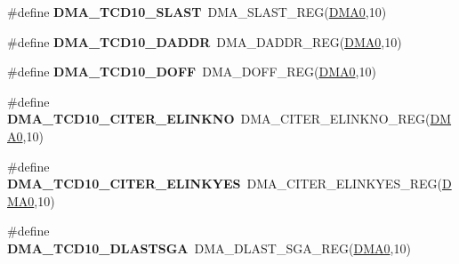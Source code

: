 \begin{DoxyCompactItemize}
\item 
\#define {\bfseries D\+M\+A\+\_\+\+T\+C\+D10\+\_\+\+S\+L\+A\+ST}~D\+M\+A\+\_\+\+S\+L\+A\+S\+T\+\_\+\+R\+EG(\hyperlink{group__DMA__Peripheral__Access__Layer_ga4103044f9ca209772f513dc694513ffb}{D\+M\+A0},10)\hypertarget{group__DMA__Register__Accessor__Macros_ga8cb4717fe169f84271e8975cc5903950}{}\label{group__DMA__Register__Accessor__Macros_ga8cb4717fe169f84271e8975cc5903950}

\item 
\#define {\bfseries D\+M\+A\+\_\+\+T\+C\+D10\+\_\+\+D\+A\+D\+DR}~D\+M\+A\+\_\+\+D\+A\+D\+D\+R\+\_\+\+R\+EG(\hyperlink{group__DMA__Peripheral__Access__Layer_ga4103044f9ca209772f513dc694513ffb}{D\+M\+A0},10)\hypertarget{group__DMA__Register__Accessor__Macros_ga659dd82f494760eb11d0dcb7abe58624}{}\label{group__DMA__Register__Accessor__Macros_ga659dd82f494760eb11d0dcb7abe58624}

\item 
\#define {\bfseries D\+M\+A\+\_\+\+T\+C\+D10\+\_\+\+D\+O\+FF}~D\+M\+A\+\_\+\+D\+O\+F\+F\+\_\+\+R\+EG(\hyperlink{group__DMA__Peripheral__Access__Layer_ga4103044f9ca209772f513dc694513ffb}{D\+M\+A0},10)\hypertarget{group__DMA__Register__Accessor__Macros_gad4889efa76dd652b839b05370678f1c9}{}\label{group__DMA__Register__Accessor__Macros_gad4889efa76dd652b839b05370678f1c9}

\item 
\#define {\bfseries D\+M\+A\+\_\+\+T\+C\+D10\+\_\+\+C\+I\+T\+E\+R\+\_\+\+E\+L\+I\+N\+K\+NO}~D\+M\+A\+\_\+\+C\+I\+T\+E\+R\+\_\+\+E\+L\+I\+N\+K\+N\+O\+\_\+\+R\+EG(\hyperlink{group__DMA__Peripheral__Access__Layer_ga4103044f9ca209772f513dc694513ffb}{D\+M\+A0},10)\hypertarget{group__DMA__Register__Accessor__Macros_gacb96c7d83ed3e4a7d09e164668dbfb40}{}\label{group__DMA__Register__Accessor__Macros_gacb96c7d83ed3e4a7d09e164668dbfb40}

\item 
\#define {\bfseries D\+M\+A\+\_\+\+T\+C\+D10\+\_\+\+C\+I\+T\+E\+R\+\_\+\+E\+L\+I\+N\+K\+Y\+ES}~D\+M\+A\+\_\+\+C\+I\+T\+E\+R\+\_\+\+E\+L\+I\+N\+K\+Y\+E\+S\+\_\+\+R\+EG(\hyperlink{group__DMA__Peripheral__Access__Layer_ga4103044f9ca209772f513dc694513ffb}{D\+M\+A0},10)\hypertarget{group__DMA__Register__Accessor__Macros_ga4a9afa879af2aa3200e1f24dd95c92de}{}\label{group__DMA__Register__Accessor__Macros_ga4a9afa879af2aa3200e1f24dd95c92de}

\item 
\#define {\bfseries D\+M\+A\+\_\+\+T\+C\+D10\+\_\+\+D\+L\+A\+S\+T\+S\+GA}~D\+M\+A\+\_\+\+D\+L\+A\+S\+T\+\_\+\+S\+G\+A\+\_\+\+R\+EG(\hyperlink{group__DMA__Peripheral__Access__Layer_ga4103044f9ca209772f513dc694513ffb}{D\+M\+A0},10)\hypertarget{group__DMA__Register__Accessor__Macros_gaf1953e0548e3e985d1132f7c5751734b}{}\label{group__DMA__Register__Accessor__Macros_gaf1953e0548e3e985d1132f7c5751734b}


\end{DoxyCompactItemize}
